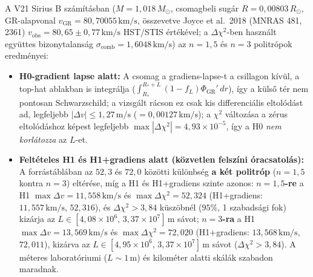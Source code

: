 \documentclass[10pt,a4paper]{article}
\begin{document}
\par
A V21 Sirius B sz\'am\'it\'asban ($M = 1{,}018\,M_\odot$, csomagbeli sug\'ar $R = 0{,}00803\,R_\odot$, GR-alapvonal $v_{\text{GR}} = 80{,}70055\,\text{km/s}$, \"osszevetve Joyce et al.\ 2018 (MNRAS 481, 2361) $v_{\text{obs}} = 80{,}65 \pm 0{,}77\,\text{km/s}$ HST/STIS \'ert\'ek\'evel; a $\Delta\chi^2$-ben haszn\'alt egy\"uttes bizonytalans\'ag $\sigma_{\text{comb}} = 1{,}6048\,\text{km/s}$) az $n=1{,}5$ \'es $n=3$ politr\'opok eredm\'enyei:
\begin{itemize}\setlength{\itemsep}{1.5pt}\setlength{\parskip}{0pt}\setlength{\topsep}{1pt}
  \item \textbf{H0-gradient lapse alatt:} A csomag a gradiens-lapse-t a csillagon k\'iv\"ul, a top-hat ablakban is integr\'alja ($\int_{R_*}^{R_*+L}(1-f_L)\Phi_{\text{GR}}'\,dr$), \'igy a k\"uls\H{o} t\'er nem pontosan Schwarzschild; a vizsg\'alt r\'acson ez csak kis differenci\'alis eltol\'od\'ast ad, legfeljebb \textbf{$|\Delta v| \le 1{,}27\,\text{m/s}$} ($= 0{,}00127\,\text{km/s}$); a $\chi^2$ v\'altoz\'asa a z\'erus eltol\'od\'ashoz k\'epest legfeljebb $\max|\Delta\chi^2| = 4{,}93\times 10^{-5}$, \'igy a H0 \emph{nem korl\'atozza} az $L$-et.
  \item \textbf{Felt\'eteles H1 \'es H1+gradiens alatt (k\"ozvetlen felsz\'ini \'oracsatol\'as):} A forr\'ast\'abl\'aban az $52{,}3$ \'es $72{,}0$ k\"oz\"otti k\"ul\"onbs\'eg \textbf{a k\'et politr\'op} ($n=1{,}5$ kontra $n=3$) elt\'er\'ese, m\'ig a H1 \'es H1+gradiens szinte azonos: \textbf{$n=1{,}5$-re} a H1 $\max\Delta v = 11{,}558\,\text{km/s}$ \'es $\max\Delta\chi^2 = 52{,}324$ (H1+gradiens: $11{,}557\,\text{km/s}$, $52{,}316$), \'es $\Delta\chi^2 > 3{,}84$ k\"usz\"obn\'el ($95\%$, 1 szabads\'agi fok) kiz\'arja az \textbf{$L \in [4{,}08\times 10^6,\, 3{,}37\times 10^7]\,\text{m}$} s\'avot; \textbf{$n=3$-ra} a H1 $\max\Delta v = 13{,}569\,\text{km/s}$ \'es $\max\Delta\chi^2 = 72{,}020$ (H1+gradiens: $13{,}568\,\text{km/s}$, $72{,}011$), kiz\'arva az \textbf{$L \in [4{,}95\times 10^6,\, 3{,}37\times 10^7]\,\text{m}$} s\'avot ($\Delta\chi^2 > 3{,}84$). A m\'eteres laborat\'oriumi ($L \sim 1\,\text{m}$) \'es kilom\'eter alatti sk\'al\'ak szabadon maradnak.
\end{itemize}
\end{document}
